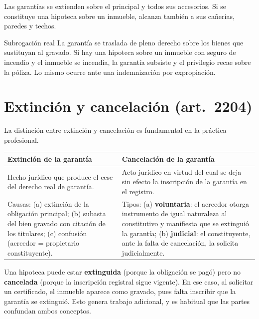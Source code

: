 \documentclass[12pt,oneside]{book}
\begin{document}
Las garantías se extienden sobre el principal y todos sus accesorios. Si se constituye una hipoteca sobre un inmueble, alcanza también a sus cañerías, paredes y techos.

\begin{definicion}{Subrogación real}
La garantía se traslada de pleno derecho sobre los bienes que sustituyan al gravado. Si hay una hipoteca sobre un inmueble con seguro de incendio y el inmueble se incendia, la garantía subsiste y el privilegio recae sobre la póliza. Lo mismo ocurre ante una indemnización por expropiación.
\end{definicion}

\section{Extinción y cancelación (art.~2204)}

La distinción entre extinción y cancelación es fundamental en la práctica profesional.

\begin{table}[H]
\centering
\begin{tabularx}{\textwidth}{@{}LL@{}}
\toprule
\textbf{Extinción de la garantía} & \textbf{Cancelación de la garantía} \\
\midrule
Hecho jurídico que produce el cese del derecho real de garantía. & Acto jurídico en virtud del cual se deja sin efecto la inscripción de la garantía en el registro. \\
\addlinespace
Causas: (a) extinción de la obligación principal; (b) subasta del bien gravado con citación de los titulares; (c) confusión (acreedor = propietario constituyente). & Tipos: (a) \textbf{voluntaria}: el acreedor otorga instrumento de igual naturaleza al constitutivo y manifiesta que se extinguió la garantía; (b) \textbf{judicial}: el constituyente, ante la falta de cancelación, la solicita judicialmente. \\
\bottomrule
\end{tabularx}
\end{table}

\begin{importante}
Una hipoteca puede estar \textbf{extinguida} (porque la obligación se pagó) pero no \textbf{cancelada} (porque la inscripción registral sigue vigente). En ese caso, al solicitar un certificado, el inmueble aparece como gravado, pues falta inscribir que la garantía se extinguió. Esto genera trabajo adicional, y es habitual que las partes confundan ambos conceptos.
\end{importante}
\end{document}
